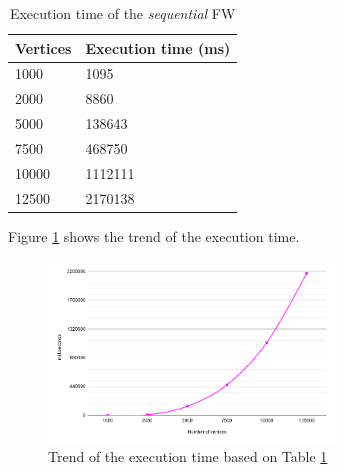\documentclass[twocolumns]{IEEEtran}
\begin{document}
\begin{table}[h!]
\centering
\begin{tabular}{|l|l|}
\hline
\rowcolor[HTML]{3166FF} 
{\color[HTML]{FFFFFF} \textbf{Vertices}} & {\color[HTML]{FFFFFF} \textbf{Execution time (ms)}} \\ \hline
1000                                     & 1095                                                \\ \hline
2000                                     & 8860                                                \\ \hline
5000                                     & 138643                                              \\ \hline
7500                                     & 468750                                              \\ \hline
10000                                    & 1112111                                             \\ \hline
12500                                    & 2170138                                             \\ \hline
\end{tabular}
\caption{Execution time of the \emph{sequential} FW}                                                                                                                                            
\label{tab:seq-time} 
\end{table}

Figure \ref{fig:seq-time} shows the trend of the execution time. 

\begin{figure}[h!]
\centering                                                                        
\includegraphics[width=3in]{images/seq-time}
\captionsetup{justification=centering,margin=2cm}                                                                                                                                   
\caption{Trend of the execution time based on Table \ref{tab:seq-time}}                                                                                                                                            
\label{fig:seq-time}                                                                                                                                                           
\end{figure}
\end{document}
